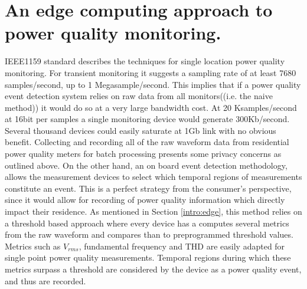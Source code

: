 \section{An edge computing approach to power quality monitoring.}\label{sec:edge-computing-approach-to-power-quality-monitoring.}

IEEE1159 standard describes the techniques for single location power quality monitoring.
For transient monitoring it suggests a sampling rate of at least 7680 samples/second, up to 1 Megasample/second.
This implies that if a power quality event detection system relies on raw data from all monitors((i.e. the naive method)) it would do so at a very large bandwidth cost.
At 20 Ksamples/second at 16bit per samples a single monitoring device would generate 300Kb/second.
Several thousand devices could easily saturate at 1Gb link with no obvious benefit.
Collecting and recording all of the raw waveform data from residential power quality meters for batch processing presents some privacy concerns as outlined above.
On the other hand, an on board event detection methodology, allows the measurement devices to select which temporal regions of measurements constitute an event.
This is a perfect strategy from the consumer's perspective, since it would allow for recording of power quality information which directly impact their residence.
As mentioned in Section \ref{intro:edge}, this method relies on a threshold based approach where every device has a computes several metrics from the raw waveform and compares than to preprogrammed threshold values.
Metrics such as $V_{rms}$, fundamental frequency and THD are easily adapted for single point power quality measurements.
Temporal regions during which these metrics surpass a threshold are considered by the device as a power quality event, and thus are recorded.


